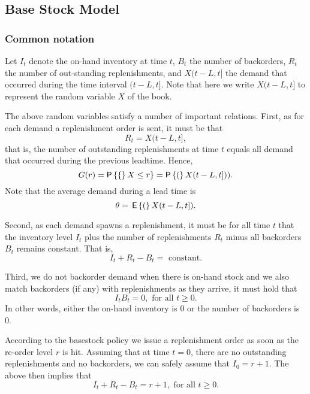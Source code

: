 

\subsection{Base Stock Model}


\subsubsection{Common notation}
\label{sec:common-notation}

Let $I_t$ denote the on-hand inventory at time $t$, $B_t$ the number
of backorders, $R_t$ the number of out-standing replenishments, and
$X(t-L,t]$ the demand that occurred during the time interval
$(t-L, t]$. Note that here we write $X(t-L, t]$ to represent the
random variable $X$ of the book.


The above random variables satisfy a number of important relations.
First, as for each demand a replenishment order is sent, it must be that
\begin{equation}
  \label{eq:8}
   R_t = X(t-L, t],
\end{equation}
that is, the number of outstanding replenishments at time $t$ equals
all demand that occurred during the previous leadtime.  Hence,
\begin{equation}
  \label{eq:16}
   G(r) = \P\{X\leq r\} = \P(X(t-L, t])).
\end{equation}
Note that the average demand during a lead time is
\begin{equation*}
\theta = \,\mathsf{E}\left\{(\right\}X(t-L, t]).
\end{equation*}

Second, as each demand spawns a replenishment, it must be for all time
$t$ that the inventory level $I_t$ plus the number of
replenishments $R_t$ minus all backorders $B_t$ remains
constant. That is, 
\begin{equation*}
I_t + R_t - B_t = \text{ constant}.
\end{equation*}

Third, we do not backorder demand when there is on-hand stock and we
also match backorders (if any) with replenishments as they arrive, it
must hold that
\begin{equation}
  \label{eq:9}
   I_t B_t =0, \text{ for all }  t\geq 0.
\end{equation}
In other words, either the on-hand inventory is $0$ or the
number of backorders is 0.

According to the basestock policy we issue a replenishment order as
soon as the re-order level $r$ is hit. Assuming that at time $t=0$,
there are no outstanding replenishments and no backorders, we can
safely assume that $I_0 = r+1$. The above then implies that
\begin{equation}
  \label{eq:7}
   I_t + R_t - B_t = r+1, \text{ for all }  t\geq 0.
\end{equation}

